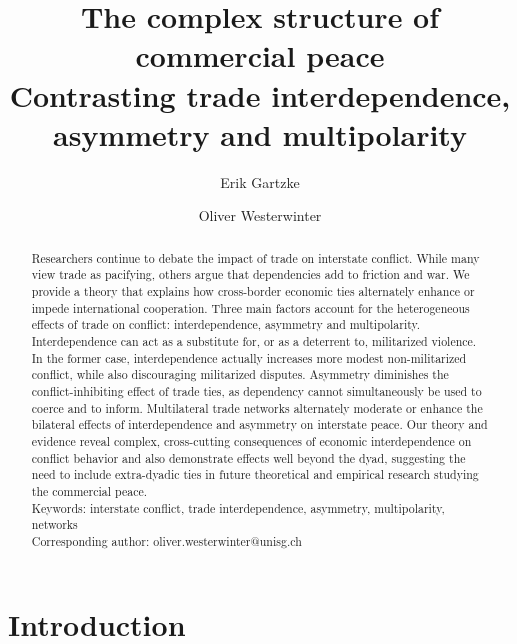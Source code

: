 \documentclass[12pt]{article}
\title{The complex structure of commercial peace \\ \Large{Contrasting trade interdependence, asymmetry and multipolarity}}
\author[*]{Erik Gartzke}
\author[**]{Oliver Westerwinter}
\affil[*]{Department of Political Science, University of California, San Diego}
\affil[**]{Department of Political Science, University of St. Gallen}
\date{}
\theoremstyle{hypothesis}
\begin{document}
\maketitle

\vspace{2cm}



\begin{abstract}

\noindent Researchers continue to debate the impact of trade on interstate conflict. While many view trade as pacifying, others argue that dependencies add to friction and war. We provide a theory that explains how cross-border economic ties alternately enhance or impede international cooperation.  Three main factors account for the heterogeneous effects of trade on conflict:  interdependence, asymmetry and multipolarity.  Interdependence can act as a substitute for, or as a deterrent to, militarized violence.  In the former case, interdependence actually increases more modest non-militarized conflict, while also discouraging militarized disputes.  Asymmetry diminishes the conflict-inhibiting effect of trade ties, as dependency cannot simultaneously be used to coerce and to inform.  Multilateral trade networks alternately moderate or enhance the bilateral effects of interdependence and asymmetry on interstate peace.  Our theory and evidence reveal complex, cross-cutting consequences of economic interdependence on conflict behavior and also demonstrate effects well beyond the dyad, suggesting the need to include extra-dyadic ties in future theoretical and empirical research studying the commercial peace.\\

\noindent Keywords: interstate conflict, trade interdependence, asymmetry, multipolarity, networks\\

\noindent Corresponding author: oliver.westerwinter@unisg.ch\\

\end{abstract}

\thispagestyle{empty}

\newpage

\section*{Introduction}
\end{document}
